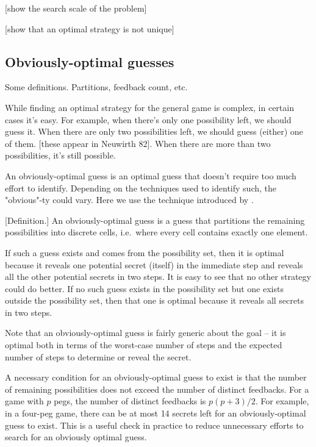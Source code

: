 [show the search scale of the problem]

[show that an optimal strategy is not unique]

\subsection{Obviously-optimal guesses}

Some definitions. Partitions, feedback count, etc.



While finding an optimal strategy for the general game is complex, in certain cases it's easy. For example, when there's only one possibility left, we should guess it. When there are only two possibilities left, we should guess (either) one of them. [these appear in Neuwirth 82]. When there are more than two possibilities, it's still possible.

An obviously-optimal guess is an optimal guess that doesn't require too much effort to identify. Depending on the techniques used to identify such, the "obvious"-ty could vary. Here we use the technique introduced by \cite{koyama93}. 

[Definition.] An obviously-optimal guess is a guess that partitions the remaining possibilities into discrete cells, i.e.\ where every cell contains exactly one element. 

If such a guess exists and comes from the possibility set, then it is optimal because it reveals one potential secret (itself) in the immediate step and reveals all the other potential secrets in two steps. It is easy to see that no other strategy could do better. If no such guess exists in the possibility set but one exists outside the possibility set, then that one is optimal because it reveals all secrets in two steps. 

Note that an obviously-optimal guess is fairly generic about the goal -- it is optimal both in terms of the worst-case number of steps and the expected number of steps to determine or reveal the secret.

A necessary condition for an obviously-optimal guess to exist is that the number of remaining possibilities does not exceed the number of distinct feedbacks. For a game with $p$ pegs, the number of distinct feedbacks is $p(p+3)/2$. For example, in a four-peg game, there can be at most 14 secrets left for an obviously-optimal guess to exist. This is a useful check in practice to reduce unnecessary efforts to search for an obviously optimal guess.


